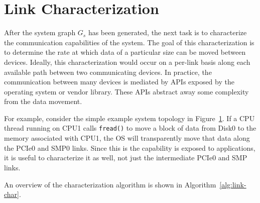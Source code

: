 %
%
\section{Link Characterization}
\label{sec:link-char}

After the system graph $G_s$ has been generated, the next task is to characterize the communication capabilities of the system.
The goal of this characterization is to determine the rate at which data of a particular size can be moved between devices.
Ideally, this characterization would occur on a per-link basis along each available path between two communicating devices.
In practice, the communication between many devices is mediated by APIs exposed by the operating system or vendor library.
These APIs abstract away some complexity from the data movement.

\begin{figure}
    \centering
    \caption[A simple example topology]{}
    \label{fig:simple-topology}
\end{figure}

For example, consider the simple example system topology in Figure~\ref{fig:simple-topology}.
If a CPU thread running on CPU1 calls \texttt{fread()} to move a block of data from Disk0 to the memory associated with CPU1, the OS will transparently move that data along the PCIe0 and SMP0 links.
Since this is the capability is exposed to applications, it is useful to characterize it as well, not just the intermediate PCIe0 and SMP links.

An overview of the characterization algorithm is shown in Algorithm~\ref{alg:link-char}.


